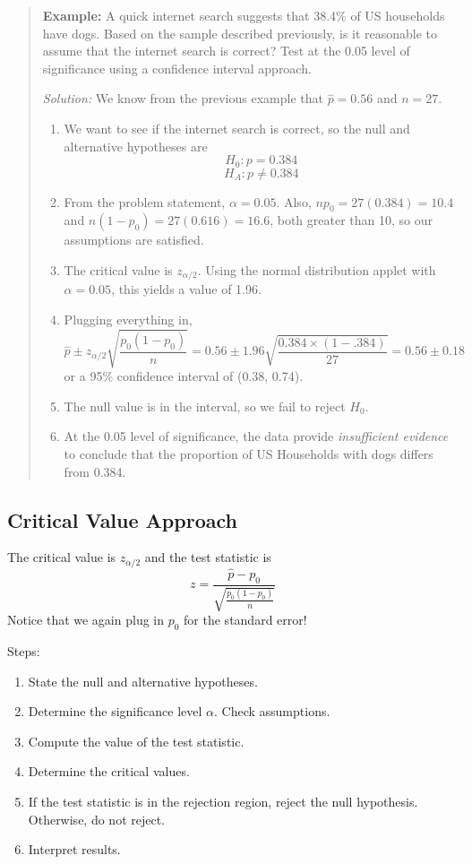 \documentclass[
]{book}
\providecommand{\tightlist}{%
  \setlength{\itemsep}{0pt}\setlength{\parskip}{0pt}}
\begin{document}
\begin{quote}
\textbf{Example:} A quick internet search suggests that 38.4\% of US households have dogs. Based on the sample described previously, is it reasonable to assume that the internet search is correct? Test at the 0.05 level of significance using a confidence interval approach.

\emph{Solution:} We know from the previous example that \(\hat{p} = 0.56\) and \(n=27\).

\begin{enumerate}
\def\labelenumi{\arabic{enumi}.}
\tightlist
\item
  We want to see if the internet search is correct, so the null and alternative hypotheses are \[H_0: p = 0.384\] \[H_A: p \ne 0.384\]
\item
  From the problem statement, \(\alpha = 0.05\). Also, \(np_0 = 27(0.384)=10.4\) and \(n(1-p_0)=27(0.616)=16.6\), both greater than 10, so our assumptions are satisfied.
\item
  The critical value is \(z_{\alpha/2}\). Using the normal distribution applet with \(\alpha = 0.05\), this yields a value of 1.96.
\item
  Plugging everything in, \[\hat{p}\pm z_{\alpha/2}\sqrt{\frac{p_0(1-p_0)}{n}} = 0.56 \pm 1.96\sqrt{\frac{0.384\times(1-.384)}{27}} = 0.56 \pm 0.18 \] or a 95\% confidence interval of (0.38, 0.74).
\item
  The null value is in the interval, so we fail to reject \(H_0\).
\item
  At the 0.05 level of significance, the data provide \emph{insufficient evidence} to conclude that the proportion of US Households with dogs differs from 0.384.
\end{enumerate}
\end{quote}

\subsection{Critical Value Approach}\label{critical-value-approach}

The critical value is \(z_{\alpha/2}\) and the test statistic is \[z = \frac{\hat{p} - p_0}{\sqrt{\frac{p_0(1-p_0)}{n}}}\] Notice that we again plug in \(p_0\) for the standard error!

Steps:

\begin{enumerate}
\def\labelenumi{\arabic{enumi}.}
\tightlist
\item
  State the null and alternative hypotheses.
\item
  Determine the significance level \(\alpha\). Check assumptions.
\item
  Compute the value of the test statistic.
\item
  Determine the critical values.
\item
  If the test statistic is in the rejection region, reject the null hypothesis. Otherwise, do not reject.
\item
  Interpret results.
\end{enumerate}
\end{document}
